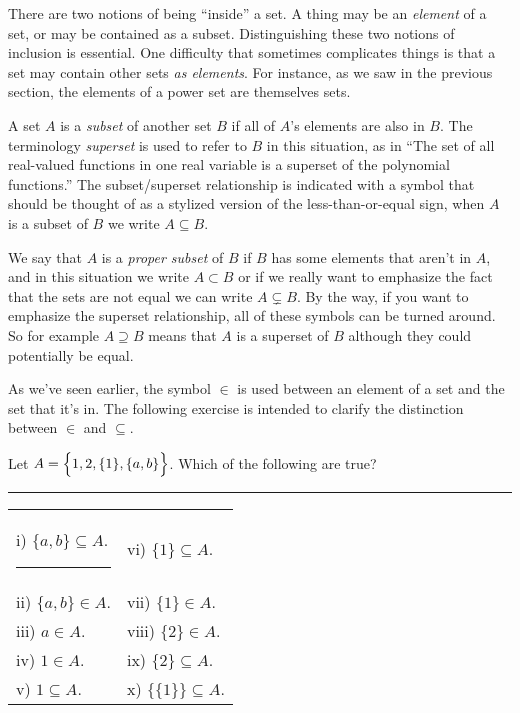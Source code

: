 There are two notions of being ``inside'' a set.  A thing may be
an \emph{element} of a set, or may be contained as
a subset.  Distinguishing these two notions of inclusion is essential.   
One difficulty that sometimes complicates things is that  a set may contain
other sets \emph{as elements}.  For instance, as we saw in the previous 
section, the elements of a power set are themselves sets.  

A set $A$ is a \emph{subset} of another set $B$ if all of $A$'s elements
are also in $B$.  The terminology 
\emph{superset} is used to refer
to $B$ in this situation, as in ``The set of all real-valued functions %
in one real variable is a superset of the polynomial functions.''  The 
subset/superset relationship is indicated with a symbol that should be
thought of as a stylized version of the less-than-or-equal sign, when
$A$ is a subset of $B$ we write $A \subseteq B$.  

We say that $A$ is 
a \emph{proper subset} of $B$ if $B$ has some elements that aren't in
$A$, and in this situation we write $A \subset B$ or if we really want
to emphasize the fact that the sets are not equal we can write 
$A \subsetneq B$.  By the way, if you want to emphasize the superset
relationship, all of these symbols can be turned around.  So for example
$A \supseteq B$ means that $A$ is a superset of $B$ although they could
potentially be equal.

As we've seen earlier, the symbol $\in$ is used between an element of
a set and the set that it's in.  The following exercise is intended to
clarify the distinction between $\in$ and $\subseteq$.

\begin{exer}
Let $A = \left\{ \rule{0pt}{10pt} 1, 2, \{ 1 \}, \{ a, b \} \right\}$.
Which of the following are true?

\vfill

\rule{72pt}{0pt} \begin{tabular}{ll}
i) $ \{ a, b \} \subseteq A$. \rule{36pt}{0pt} & vi) $  \{ 1 \} \subseteq A$.\\
ii) $ \{ a, b \} \in A$. & vii) $  \{ 1 \} \in A$.\\
iii) $  a \in A$. & viii) $  \{ 2 \} \in A$.\\
iv) $  1 \in A$. & ix) $  \{ 2 \} \subseteq A$.\\
v) $  1 \subseteq A$. & x) $  \{\{1\}\} \subseteq A$.\\
\end{tabular}
\end{exer}

